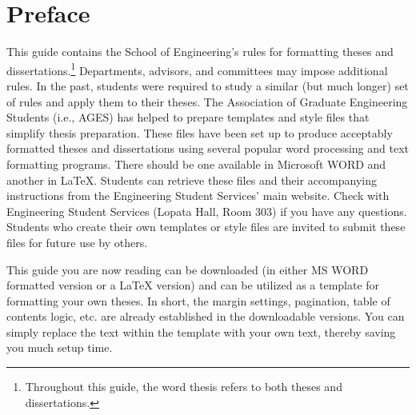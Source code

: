 \begin{singlespace}
\tableofcontents

\renewcommand{\listoftablespostscript}{
\small
\textbf{Note:} Be consistent in aligning multi-lined table-names, figure-names,
and chapter/section-names throughout your document.  It is generally
recommended to make sure any additional lines (i.e., within a long title or a
long table name) wrap and align immediately under the 1st character of the
title or name with which they are associated in the line immediately above ---
as shown in the ``Table 2.1'' example above.   Whatever approach you take, be
consistent.}

\listoftables

\listoffigures
\end{singlespace}

\chapter{Preface}

This guide contains the School of Engineering's rules for formatting theses and
dissertations.\footnote{Throughout this guide, the word thesis refers to both
theses and dissertations.}   Departments, advisors, and committees may impose
additional rules.  In the past, students were required to study a similar (but
much longer) set of rules and apply them to their theses.  The Association of
Graduate Engineering Students (i.e., AGES) has helped to prepare templates and
style files that simplify thesis preparation.  These files have been set up to
produce acceptably formatted theses and dissertations using several popular
word processing and text formatting programs.  There should be one available in
Microsoft WORD and another in \LaTeX{}.  Students can retrieve these files and
their accompanying instructions from the Engineering Student Services' main
website.  Check with Engineering Student Services (Lopata Hall, Room 303) if
you have any questions.  Students who create their own templates or style files
are invited to submit these files for future use by others.

This guide you are now reading can be downloaded (in either MS WORD formatted
version or a \LaTeX{} version) and can be utilized as a template for formatting
your own theses.  In short, the margin settings, pagination, table of contents
logic, etc. are already established in the downloadable versions.  You can
simply replace the text within the template with your own text, thereby saving
you much setup time.

